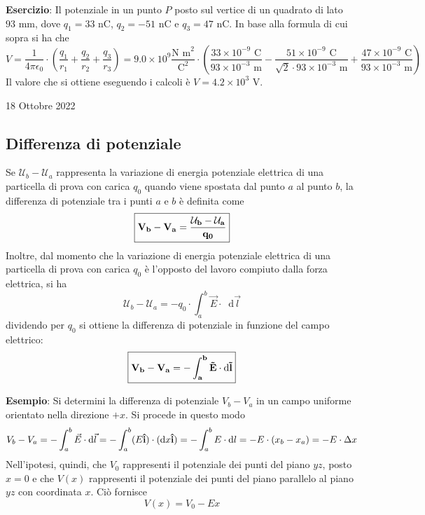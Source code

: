\documentclass[a4paper]{extarticle}
\newcommand\dif{\mathop{}\!\mathrm{d}}
\begin{document}
\vspace{2em}
\noindent
\textbf{Esercizio}: Il potenziale in un punto $P$ posto sul vertice di un quadrato di lato $93 \text{ mm}$, dove $q_1=33$ nC, $q_2=-51$ nC e $q_3=47$ nC. In base alla formula di cui sopra si ha che
\[V=\frac{1}{4 \pi \epsilon_0} \cdot \left(\frac{q_1}{r_1}+\frac{q_2}{r_2}+\frac{q_3}{r_3}\right) = 9.0 \times 10^9 \frac{\text{N m}^2}{\text{C}^2} \cdot \left(\frac{33 \times 10^{-9} \text{ C}}{93 \times 10^{-3} \text{ m}} - \frac{51 \times 10^{-9} \text{ C}}{\sqrt{2} \cdot 93 \times 10^{-3} \text{ m}} + \frac{47 \times 10^{-9} \text{ C}}{93 \times 10^{-3} \text{ m}}\right)\]
Il valore che si ottiene eseguendo i calcoli è $V= 4.2 \times 10^3$ V.

\newpage
\noindent
\begin{center}
  18 Ottobre 2022
\end{center}
\subsection{Differenza di potenziale}
Se $\mathcal{U}_b - \mathcal{U}_a$ rappresenta la variazione di energia potenziale elettrica di una particella di prova con carica $q_0$ quando viene spostata dal punto $a$ al punto $b$, la differenza di potenziale tra i punti $a$ e $b$ è definita come
\[\boxed{\bf{V_b-V_a=\frac{\mathcal{U}_b-\mathcal{U}_a}{q_0}}}\]
Inoltre, dal momento che la variazione di energia potenziale elettrica di una particella di prova con carica $q_0$ è l'opposto del lavoro compiuto dalla forza elettrica, si ha
\[\mathcal{U}_b-\mathcal{U}_a=-q_0 \cdot \int_a^b \vec E \cdot \dif \vec l\]
dividendo per $q_0$ si ottiene la differenza di potenziale in funzione del campo elettrico:
\[\boxed{\bf{V_b-V_a=-\int_a^b \vec E \cdot \dif \vec l}}\]

\vspace{1em}
\noindent
\textbf{Esempio}: Si determini la differenza di potenziale $V_b-V_a$ in un campo uniforme orientato nella direzione $+x$. Si procede in questo modo
\[V_b-V_a=-\int_a^b \vec E \cdot \dif \vec l = -\int_a^b (E {\bf{\hat i}}) \cdot (\dif x {\bf{\hat i}}) = -\int_a^b E \cdot \dif l = -E \cdot (x_b-x_a) = -E \cdot \Delta x\]
Nell'ipotesi, quindi, che $V_0$ rappresenti il potenziale dei punti del piano $yz$, posto $x=0$ e che $V(x)$ rappresenti il potenziale dei punti del piano parallelo al piano $yz$ con coordinata $x$. Ciò fornisce
\[\boxed{V(x) = V_0-Ex}\]
\end{document}
